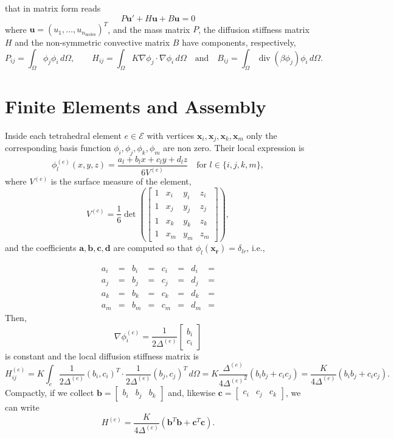 \documentclass[hidelinks]{article}
\DeclareMathOperator{\divg}{div}
\begin{document}
that in matrix form reads \[ P\mathbf{u}' + H\mathbf{u} + B\mathbf{u} = 0\] where $\mathbf{u} = (u_1, \dots, u_{n_\text{nodes}})^T$, and the mass matrix $P$, the diffusion stiffness matrix $H$ and the non-symmetric convective matrix $B$ have components, respectively,
\[P_{ij} = \int_\Omega \phi_j \phi_i\, d\Omega ,\quad\quad H_{ij} = \int_\Omega K \nabla \phi_j \cdot \nabla \phi_i\, d\Omega \quad \text{and} \quad B_{ij} = \int_\Omega  \divg( \beta \phi_j) \phi_i\,d\Omega.\]

\section{Finite Elements and Assembly}

Inside each tetrahedral element $e\in\mathcal{E}$ with vertices $\mathbf{x}_i, \mathbf{x}_j, \mathbf{x}_k, \mathbf{x}_m$ only the corresponding basis function $\phi_i,\phi_j,\phi_k,\phi_m$ are non zero. Their local expression is 
\[
\phi_l^{(e)} (x,y,z)= \frac{a_l + b_l x + c_l y + d_l z}{6V^{(e)}} \quad \text{for } l \in \{i,j,k,m\},
\]
where $V^{(e)}$ is the surface measure of the element,
\[
V^{(e)} = \frac{1}{6}\det \left(\begin{bmatrix}
    1 & x_i & y_i & z_i \\ 1 & x_j & y_j & z_j\\ 1 & x_k & y_k & z_k \\ 1 & x_m & y_m & z_m
\end{bmatrix} \right),
\]
and the coefficients $\mathbf{a}, \mathbf{b}, \mathbf{c}, \mathbf{d}$ are computed so that $\phi_l(\mathbf{x_r}) = \delta_{lr}$, i.e., 

\begin{align*}
a_i &= & b_i &= & c_i &= & d_i &= \\
a_j &= & b_j &= & c_j &= & d_j &= \\
a_k &= & b_k &= & c_k &= & d_k &= \\
a_m &= & b_m &= & c_m &= & d_m &= 
\end{align*}
Then, \[\nabla \phi_i^{(e)} = \frac{1}{2\Delta^{(e)}}\begin{bmatrix}
    b_i \\ c_i
\end{bmatrix} \] is constant and the local diffusion stiffness matrix is 
\[ H_{ij}^{(e)} = K \int_e \frac{1}{2\Delta^{(e)}}(b_i, c_i)^T \cdot \frac{1}{2\Delta^{(e)}}(b_j, c_j)^T \,d\Omega = K \frac{\Delta^{(e)}}{{4\Delta^{(e)}}^2} (b_ib_j + c_ic_j) = \frac{K}{4\Delta^{(e)}} (b_ib_j + c_ic_j). \]
Compactly, if we collect $\mathbf{b} = \begin{bmatrix} b_i & b_j & b_k \end{bmatrix}$ and, likewise $\mathbf{c} = \begin{bmatrix} c_i & c_j & c_k \end{bmatrix}$, we can write 
\[ H^{(e)} = \frac{K}{4\Delta^{(e)}}(\mathbf{b}^T\mathbf{b} + \mathbf{c}^T\mathbf{c}).
\]
\end{document}
